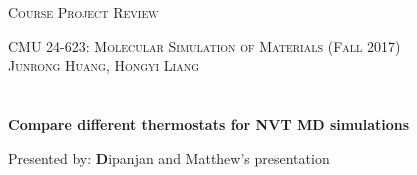 \documentclass{article}
\begin{document}
\section*{}
\begin{center}
  \vspace{0.5em}
  \centerline{\textsc{\Large Course Project Review}}
  \vspace{1em}
  \textsc{\large CMU 24-623: Molecular Simulation of Materials (Fall 2017)} \\
  \vspace{1em}
  \textsc{\large Junrong Huang, Hongyi Liang} \\
\end{center}

\section*{}
\begin{center}
\centerline{\textbf{\Large Compare different thermostats for NVT MD simulations}}
\centerline{Presented by: {\textbf Dipanjan and Matthew’s presentation}}
\end{center}
\end{document}
